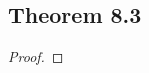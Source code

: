 \documentclass[../../main.tex]{subfiles}
\begin{document}
\subsection{Theorem 8.3}
\begin{wts}

\end{wts}
\begin{proof}

\end{proof}
\end{document}
